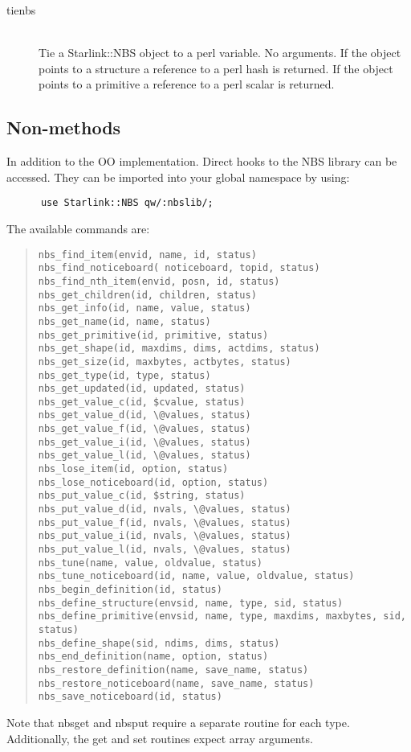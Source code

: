 \documentclass[twoside,11pt]{article}
\newenvironment{myquote}{\begin{quote}\begin{small}}{\end{small}\end{quote}}
\renewcommand{\_}{\texttt{\symbol{95}}}
\begin{document}
\begin{description}

\item[tienbs]%
%
\hfill\\
Tie a Starlink::NBS object to a perl variable. No arguments.  If the
object points to a structure a reference to a perl hash is returned.
If the object points to a primitive a reference to a perl scalar is
returned.

\end{description}

\subsection{Non-methods}%

In addition to the OO implementation. Direct hooks to the NBS library
can be accessed. They can be imported into your global namespace by
using:
\begin{verbatim}
      use Starlink::NBS qw/:nbslib/;
\end{verbatim}

The available commands are:
\begin{myquote}
\begin{verbatim}
nbs_find_item(envid, name, id, status)
nbs_find_noticeboard( noticeboard, topid, status)
nbs_find_nth_item(envid, posn, id, status)
nbs_get_children(id, children, status)
nbs_get_info(id, name, value, status)
nbs_get_name(id, name, status)
nbs_get_primitive(id, primitive, status)
nbs_get_shape(id, maxdims, dims, actdims, status)
nbs_get_size(id, maxbytes, actbytes, status)
nbs_get_type(id, type, status)
nbs_get_updated(id, updated, status)
nbs_get_value_c(id, $cvalue, status)
nbs_get_value_d(id, \@values, status)
nbs_get_value_f(id, \@values, status)
nbs_get_value_i(id, \@values, status)
nbs_get_value_l(id, \@values, status)
nbs_lose_item(id, option, status)
nbs_lose_noticeboard(id, option, status)
nbs_put_value_c(id, $string, status)
nbs_put_value_d(id, nvals, \@values, status)
nbs_put_value_f(id, nvals, \@values, status)
nbs_put_value_i(id, nvals, \@values, status)
nbs_put_value_l(id, nvals, \@values, status)
nbs_tune(name, value, oldvalue, status)
nbs_tune_noticeboard(id, name, value, oldvalue, status)
nbs_begin_definition(id, status)
nbs_define_structure(envsid, name, type, sid, status)
nbs_define_primitive(envsid, name, type, maxdims, maxbytes, sid, status)
nbs_define_shape(sid, ndims, dims, status)
nbs_end_definition(name, option, status)
nbs_restore_definition(name, save_name, status)
nbs_restore_noticeboard(name, save_name, status)
nbs_save_noticeboard(id, status)
\end{verbatim}
\end{myquote}

Note that nbs\_{}get\_{} and nbs\_{}put\_{} require a separate routine for each
type. Additionally, the get and set routines expect array arguments.




\end{document}
